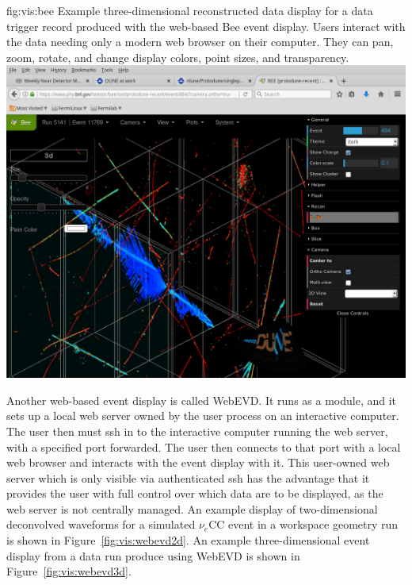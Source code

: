 \documentclass[../main-v1.tex]{subfiles}
\begin{document}
\begin{dunefigure}
{fig:vis:bee} 
{Example three-dimensional reconstructed data display for a  data trigger record produced with the web-based Bee event display.  Users interact with the data needing only a modern web browser on their computer.  They can pan, zoom, rotate, and change display colors, point sizes, and transparency.}
\includegraphics[width=0.9 \textwidth]{graphics/EventDisplays/bee_pdsp_evd1.png}
\end{dunefigure}

Another web-based event display is called WebEVD.  It runs as a  module, and it sets up a local web server owned by the user process on an interactive computer.  The user then must ssh in to the interactive computer running the web server, with a specified port forwarded.  The user then connects to that port with a local web browser and interacts with the event display with it.  This user-owned web server which is only visible via authenticated ssh has the advantage that it provides the user with full control over which data are to be displayed, as the web server is not centrally managed.  An example display of two-dimensional deconvolved waveforms for a simulated $\nu_e$CC event in a  workspace geometry run is shown in Figure~\ref{fig:vis:webevd2d}.  An example three-dimensional event display from a  data run produce using WebEVD is shown in Figure~\ref{fig:vis:webevd3d}.
\end{document}
